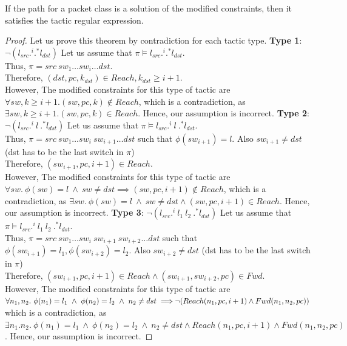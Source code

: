 \begin{theorem}
	If the path for a packet class is a solution of the modified constraints, 
	then it satisfies the tactic regular expression.
\end{theorem}
\begin{proof}
Let us prove this theorem by contradiction for each tactic type. \newline
\textbf{Type 1}: $\neg (l_{src} .^i .^* l_{dst})$ \newline
Let us assume that $\pi \models l_{src} .^i .^* l_{dst}$. \\
Thus, $\pi = src\ sw_1 \ldots sw_i \ldots dst$. \\
Therefore,  $(dst, pc, k_{dst}) \in Reach, k_{dst} \geq i + 1$. \\
However,
The modified constraints for this type of tactic are $ \forall sw,k \geq i + 1. (sw,pc,k) \notin Reach$,
which is a contradiction, as $\exists sw, k \geq i + 1. (sw,pc,k) \in Reach$. Hence, our assumption is incorrect. 
\newline \newline
\textbf{Type 2}: $\neg (l_{src} .^i \ l \ .^* l_{dst})$ \newline
Let us assume that $\pi \models l_{src} .^i \ l \ .^* l_{dst}$. \\
Thus, $\pi = src\ sw_1 \ldots sw_i \ sw_{i+1} \ldots dst$ such that $\phi(sw_{i+1}) = l$. Also $sw_{i+1} \not=dst$ (dst has to be the last switch in $\pi$)\\
Therefore,  $(sw_{i+1}, pc, i+1) \in Reach$. \\
However,
The modified constraints for this type of tactic are $\forall sw.~ \phi(sw) = l ~\wedge~ sw \not= dst \implies  (sw, pc, i + 1) \notin Reach$,
which is a contradiction, as $\exists sw. ~ \phi(sw) = l ~\wedge~ sw \not= dst \wedge (sw,pc,i+1) \in Reach$. Hence, our assumption is incorrect. 
 \newline \newline
\textbf{Type 3}: $\neg (l_{src} .^i \ l_1 \ l_2 \ .^* l_{dst})$ \newline
Let us assume that $\pi \models l_{src} .^i \ l_1 \ l_2 \ .^* l_{dst}$. \\
Thus, $\pi = src\ sw_1 \ldots sw_i \ sw_{i+1} \ sw_{i+2} \ldots dst$ such that $\phi(sw_{i+1}) = l_1, \phi(sw_{i+2}) = l_2$. Also $sw_{i+2} \not=dst$ (dst has to be the last switch in $\pi$)\\
Therefore,  $(sw_{i+1}, pc, i+1) \in Reach \wedge (sw_{i+1}, sw_{i+2}, pc) \in Fwd$. \\
However,
The modified constraints for this type of tactic are 
$\forall n_1, n_2.~\phi(n_1) = l_1~\wedge~ \phi(n_2) = l_2 ~\wedge~ n_2 \not=dst  \implies \\ 
\neg (Reach(n_1, pc, i + 1) \wedge Fwd(n_1, n_2, pc))$
which is a contradiction, as $\exists n_1. n_2. ~\phi(n_1) = l_1~\wedge~ \phi(n_2) = l_2 ~\wedge~ n_2 \not=dst \wedge Reach(n_1, pc, i + 1) \wedge Fwd(n_1, n_2, pc)$. Hence, our assumption is incorrect. 
 
\end{proof}


